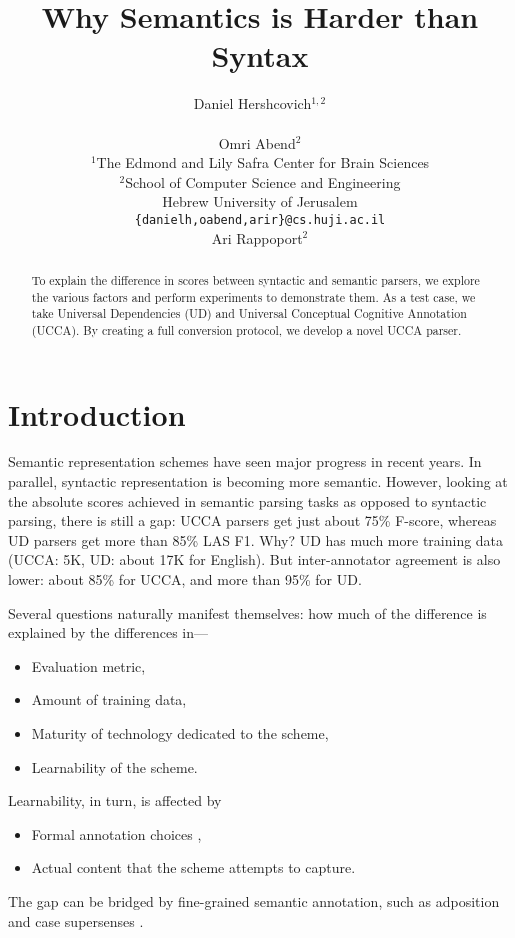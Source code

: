 \documentclass[11pt,a4paper]{article}
\title{Why Semantics is Harder than Syntax}
\author{Daniel Hershcovich$^{1,2}$ \\
  \\\And
  Omri Abend$^2$ \\
  $^1$The Edmond and Lily Safra Center for Brain Sciences \\
  $^2$School of Computer Science and Engineering \\
  Hebrew University of Jerusalem \\
  \texttt{\{danielh,oabend,arir\}@cs.huji.ac.il}
  \\\And
  Ari Rappoport$^2$
}
\date{}
\begin{document}
\maketitle

\begin{abstract}
To explain the difference in scores between syntactic and semantic parsers,
we explore the various factors and perform experiments to demonstrate them.
As a test case, we take Universal Dependencies (UD) and
Universal Conceptual Cognitive Annotation (UCCA).
By creating a full conversion protocol, we develop a novel UCCA parser.
\end{abstract}

\section{Introduction}\label{sec:introduction}

Semantic representation schemes have seen major progress in recent years.
In parallel, syntactic representation is becoming more semantic.
However, looking at the absolute scores achieved in semantic parsing tasks
as opposed to syntactic parsing,
there is still a gap:
UCCA parsers get just about 75\% F-score, whereas UD parsers get more than 85\% LAS F1. Why?
UD has much more training data (UCCA: 5K, UD: about 17K for English).
But inter-annotator agreement is also lower: about 85\% for UCCA, and more than 95\% for UD.

Several questions naturally manifest themselves:
how much of the difference is explained by the differences in---
\begin{itemize}
\item Evaluation metric,
\item Amount of training data,
\item Maturity of technology dedicated to the scheme,
\item Learnability of the scheme.
\end{itemize}

Learnability, in turn, is affected by
\begin{itemize}
\item Formal annotation choices \cite{Schwartz:12},
\item Actual content that the scheme attempts to capture.
\end{itemize}


The gap can be bridged by fine-grained semantic annotation,
such as adposition and case supersenses
\cite{schneider2017adposition,blodgett2018semantic}.
\end{document}
